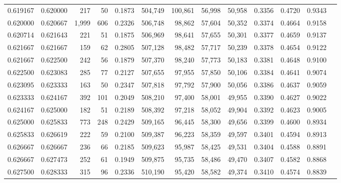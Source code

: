 \begin{tabular}{rrrrrrrrrrrrr}
0.619167 & 0.620000 &   217 &  50 &                                     0.1873 & 504,749 & 100,861 &  56,998 &  50,958 & 0.3356 & 0.4720 & 0.9343 \\
0.620000 & 0.620667 & 1,999 & 606 &                                     0.2326 & 506,748 &  98,862 &  57,604 &  50,352 & 0.3374 & 0.4664 & 0.9158 \\
0.620714 & 0.621643 &   221 &  51 &                                     0.1875 & 506,969 &  98,641 &  57,655 &  50,301 & 0.3377 & 0.4659 & 0.9137 \\
0.621667 & 0.621667 &   159 &  62 &                                     0.2805 & 507,128 &  98,482 &  57,717 &  50,239 & 0.3378 & 0.4654 & 0.9122 \\
0.621667 & 0.622500 &   242 &  56 &                                     0.1879 & 507,370 &  98,240 &  57,773 &  50,183 & 0.3381 & 0.4648 & 0.9100 \\
0.622500 & 0.623083 &   285 &  77 &                                     0.2127 & 507,655 &  97,955 &  57,850 &  50,106 & 0.3384 & 0.4641 & 0.9074 \\
0.623095 & 0.623333 &   163 &  50 &                                     0.2347 & 507,818 &  97,792 &  57,900 &  50,056 & 0.3386 & 0.4637 & 0.9059 \\
0.623333 & 0.624167 &   392 & 101 &                                     0.2049 & 508,210 &  97,400 &  58,001 &  49,955 & 0.3390 & 0.4627 & 0.9022 \\
0.624167 & 0.625000 &   182 &  51 &                                     0.2189 & 508,392 &  97,218 &  58,052 &  49,904 & 0.3392 & 0.4623 & 0.9005 \\
0.625000 & 0.625833 &   773 & 248 &                                     0.2429 & 509,165 &  96,445 &  58,300 &  49,656 & 0.3399 & 0.4600 & 0.8934 \\
0.625833 & 0.626619 &   222 &  59 &                                     0.2100 & 509,387 &  96,223 &  58,359 &  49,597 & 0.3401 & 0.4594 & 0.8913 \\
0.626667 & 0.626667 &   236 &  66 &                                     0.2185 & 509,623 &  95,987 &  58,425 &  49,531 & 0.3404 & 0.4588 & 0.8891 \\
0.626667 & 0.627473 &   252 &  61 &                                     0.1949 & 509,875 &  95,735 &  58,486 &  49,470 & 0.3407 & 0.4582 & 0.8868 \\
0.627500 & 0.628333 &   315 &  96 &                                     0.2336 & 510,190 &  95,420 &  58,582 &  49,374 & 0.3410 & 0.4574 & 0.8839 \\

\end{tabular}
